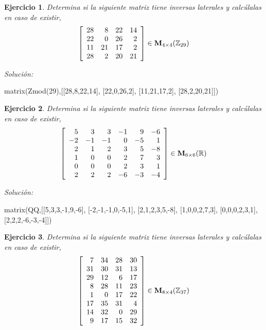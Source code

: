 \documentclass{amsart}
\newtheorem{ejer}{Ejercicio}
\begin{document}
\begin{ejer} Determina si la siguiente matriz tiene inversas laterales y calc\'ulalas en caso de existir,
\[ \left[\begin{array}{rrrr}
28 & 8 & 22 & 14 \\
22 & 0 & 26 & 2 \\
11 & 21 & 17 & 2 \\
28 & 2 & 20 & 21
\end{array}\right] \in {\bf M}_{4\times 4}({\mathbb Z}_{29})\]
\end{ejer}

{\it Soluci\'on:}

\begin{sageblock}
matrix(Zmod(29),[[28,8,22,14],
[22,0,26,2],
[11,21,17,2],
[28,2,20,21]])
\end{sageblock}



\begin{ejer} Determina si la siguiente matriz tiene inversas laterales y calc\'ulalas en caso de existir,
\[ \left[\begin{array}{rrrrrr}
5 & 3 & 3 & -1 & 9 & -6 \\
-2 & -1 & -1 & 0 & -5 & 1 \\
2 & 1 & 2 & 3 & 5 & -8 \\
1 & 0 & 0 & 2 & 7 & 3 \\
0 & 0 & 0 & 2 & 3 & 1 \\
2 & 2 & 2 & -6 & -3 & -4
\end{array}\right] \in {\bf M}_{6\times 6}({\mathbb R})\]
\end{ejer}

{\it Soluci\'on:}

\begin{sageblock}
matrix(QQ,[[5,3,3,-1,9,-6],
[-2,-1,-1,0,-5,1],
[2,1,2,3,5,-8],
[1,0,0,2,7,3],
[0,0,0,2,3,1],
[2,2,2,-6,-3,-4]])
\end{sageblock}



\begin{ejer} Determina si la siguiente matriz tiene inversas laterales y calc\'ulalas en caso de existir,
\[ \left[\begin{array}{rrrr}
7 & 34 & 28 & 30 \\
31 & 30 & 31 & 13 \\
29 & 12 & 6 & 17 \\
8 & 28 & 11 & 23 \\
1 & 0 & 17 & 22 \\
17 & 35 & 31 & 4 \\
14 & 32 & 0 & 29 \\
9 & 17 & 15 & 32
\end{array}\right] \in {\bf M}_{8\times 4}({\mathbb Z}_{37})\]
\end{ejer}
\end{document}
